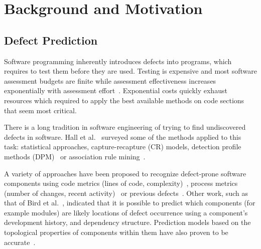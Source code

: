 \documentclass[sigconf,review, anonymous]{acmart}
\theoremstyle{break}
\theoremstyle{break}
\begin{document}

 


\section{Background and Motivation}

\subsection{Defect Prediction}
\label{sect:review}

Software programming inherently introduces defects into programs, which requires to test them before they are used. Testing
is expensive and most software assessment budgets are finite while assessment effectiveness increases exponentially with assessment effort~\cite{fu2016tuning}. Exponential costs quickly exhaust resources which required to apply the best available methods on code sections
that seem most critical.

There is a long tradition in software engineering of trying to find undiscovered defects in software. 
Hall et al.~\cite{hall2012systematic} surveyed some of the methods
applied to this task: statistical approaches, capture-recapture 
(CR) models, detection profile methods (DPM)~\cite{song2011general} or
association rule mining~\cite{song2006software}. 

A variety of approaches have been proposed to recognize
 defect-prone  software components using code metrics (lines of code, complexity)~\cite{d2010extensive,menzies2007data, nagappan2006mining,shepperd2014researcher,Menzies2010}, process metrics (number of changes, recent activity)~\cite{hassan2009predicting} or previous defects~\cite{kim2007predicting}.
Other work, such as that of 
Bird et al.~\cite{bird2009putting}, indicated that it is possible to predict which components (for example modules) are likely locations of
defect occurrence using a component's development history,
and dependency structure. 
Prediction models based on the topological properties
of components within them have also  proven to be  
accurate~\cite{zimmermann2008predicting}.
\end{document}

